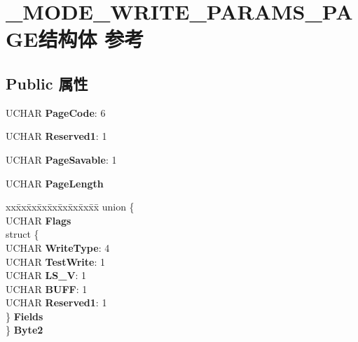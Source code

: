 \hypertarget{struct___m_o_d_e___w_r_i_t_e___p_a_r_a_m_s___p_a_g_e}{}\section{\+\_\+\+M\+O\+D\+E\+\_\+\+W\+R\+I\+T\+E\+\_\+\+P\+A\+R\+A\+M\+S\+\_\+\+P\+A\+G\+E结构体 参考}
\label{struct___m_o_d_e___w_r_i_t_e___p_a_r_a_m_s___p_a_g_e}
\subsection*{Public 属性}
\begin{DoxyCompactItemize}
\item 
\mbox{\label{struct___m_o_d_e___w_r_i_t_e___p_a_r_a_m_s___p_a_g_e_a84720e2c8a6d3655d930e1fed2971eb9}} 
U\+C\+H\+AR {\bfseries Page\+Code}\+: 6
\item 
\mbox{\label{struct___m_o_d_e___w_r_i_t_e___p_a_r_a_m_s___p_a_g_e_a45b12f48b4091780c5888c5b7e5f81b8}} 
U\+C\+H\+AR {\bfseries Reserved1}\+: 1
\item 
\mbox{\label{struct___m_o_d_e___w_r_i_t_e___p_a_r_a_m_s___p_a_g_e_a8ce7cf9565e693e030e947b59e701946}} 
U\+C\+H\+AR {\bfseries Page\+Savable}\+: 1
\item 
\mbox{\label{struct___m_o_d_e___w_r_i_t_e___p_a_r_a_m_s___p_a_g_e_ac29577fe282adc9a7cdfd948a9a9359d}} 
U\+C\+H\+AR {\bfseries Page\+Length}
\item 
\mbox{\label{struct___m_o_d_e___w_r_i_t_e___p_a_r_a_m_s___p_a_g_e_a4c858cf23d693487f7da70b840fadac9}} 
\begin{tabbing}
xx\=xx\=xx\=xx\=xx\=xx\=xx\=xx\=xx\=\kill
union \{\\
\>UCHAR {\bfseries Flags}\\
\>struct \{\\
\>\>UCHAR {\bfseries WriteType}: 4\\
\>\>UCHAR {\bfseries TestWrite}: 1\\
\>\>UCHAR {\bfseries LS\_V}: 1\\
\>\>UCHAR {\bfseries BUFF}: 1\\
\>\>UCHAR {\bfseries Reserved1}: 1\\
\>\} {\bfseries Fields}\\
\} {\bfseries Byte2}\\


\end{tabbing}
\end{DoxyCompactItemize}
